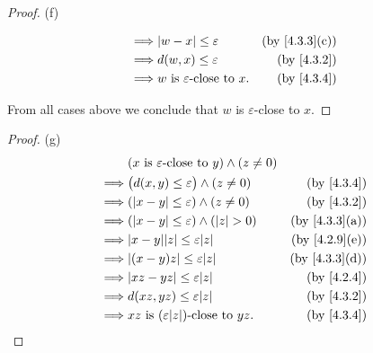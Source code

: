 \begin{proof}{(f)}
\begin{itemize}
\begin{align*}
            \implies & \abs{w - x} \leq \varepsilon                                   & \text{(by \cref{4.3.3}(c))} \\
            \implies & d(w, x) \leq \varepsilon                                       & \text{(by \cref{4.3.2})}    \\
            \implies & w \text{ is } \varepsilon\text{-close to } x.                  & \text{(by \cref{4.3.4})}
          \end{align*}
  \end{itemize}
  From all cases above we conclude that \(w\) is \(\varepsilon\)-close to \(x\).
\end{proof}

\begin{proof}{(g)}
  \begin{align*}
             & (x \text{ is } \varepsilon\text{-close to } y) \land (z \neq 0)                               \\
    \implies & \big(d(x, y) \leq \varepsilon\big) \land (z \neq 0)             & \text{(by \cref{4.3.4})}    \\
    \implies & (\abs{x - y} \leq \varepsilon) \land (z \neq 0)                 & \text{(by \cref{4.3.2})}    \\
    \implies & (\abs{x - y} \leq \varepsilon) \land (\abs{z} > 0)              & \text{(by \cref{4.3.3}(a))} \\
    \implies & \abs{x - y} \abs{z} \leq \varepsilon \abs{z}                    & \text{(by \cref{4.2.9}(e))} \\
    \implies & \abs{(x - y)z} \leq \varepsilon \abs{z}                         & \text{(by \cref{4.3.3}(d))} \\
    \implies & \abs{xz - yz} \leq \varepsilon \abs{z}                          & \text{(by \cref{4.2.4})}    \\
    \implies & d(xz, yz) \leq \varepsilon \abs{z}                              & \text{(by \cref{4.3.2})}    \\
    \implies & xz \text{ is } (\varepsilon \abs{z})\text{-close to } yz.       & \text{(by \cref{4.3.4})}
  \end{align*}
\end{proof}

